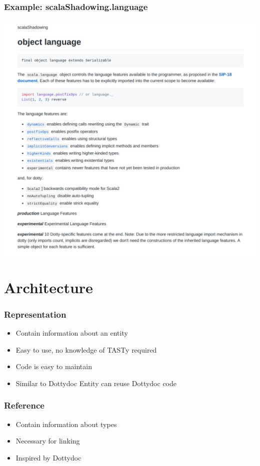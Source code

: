 \documentclass{beamer}
\begin{document}
\begin{frame}
  \frametitle{Example: scalaShadowing.language}
  \begin{center}
    \includegraphics[width=\textwidth,height=0.9\textheight,keepaspectratio]{images/language.png}
  \end{center}
\end{frame}

\section{Architecture}

\begin{frame}
  \frametitle{Representation}
  \begin{itemize}
    \item Contain information about an entity \pause
    \item Easy to use, no knowledge of TASTy required \pause
    \item Code is easy to maintain \pause
    \item Similar to Dottydoc Entity \textrightarrow can reuse Dottydoc code
  \end{itemize}
\end{frame}

\begin{frame}
  \frametitle{Reference}
  \begin{itemize}
    \item Contain information about types \pause
    \item Necessary for linking \pause
    \item Inspired by Dottydoc
  \end{itemize}
\end{frame}
\end{document}

